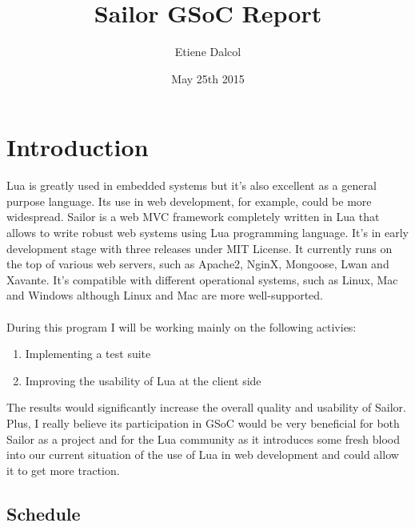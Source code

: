 \documentclass{article}
\title{Sailor GSoC Report}
\date{May 25th 2015}
\author{Etiene Dalcol}
\begin{document}
	\maketitle

	\newpage
	\tableofcontents

	\newpage
	
	\section{Introduction}
	
	Lua is greatly used in embedded systems but it's also excellent as a general purpose language. Its use in web development, for example, could be more widespread. Sailor is a web MVC framework completely written in Lua that allows to write robust web systems using Lua programming language. It's in early development stage with three releases under MIT License. It currently runs on the top of various web servers, such as Apache2, NginX, Mongoose, Lwan and Xavante. It's compatible with different operational systems, such as Linux, Mac and Windows although Linux and Mac are more well-supported. 
	\\\\
	During this program I will be working mainly on the following activies:	
	
	 \begin{enumerate}
	  \item Implementing a test suite
	  \item Improving the usability of Lua at the client side
		\end{enumerate}
	The results would significantly increase the overall quality and usability of Sailor. Plus, I really believe its participation in GSoC would be very beneficial for both Sailor as a project and for the Lua community as it introduces some fresh blood into our current situation of the use of Lua in web development and could allow it to get more traction. 

		\subsection{Schedule}
\end{document}
